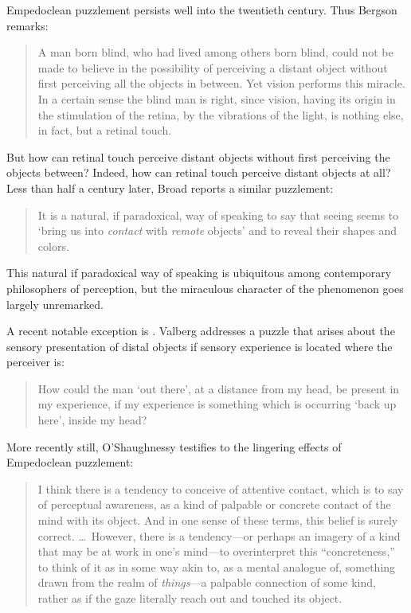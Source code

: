 Empedoclean puzzlement persists well into the twentieth century. Thus Bergson remarks:
\begin{quote}
	A man born blind, who had lived among others born blind, could not be made to believe in the possibility of perceiving a distant object without first perceiving all the objects in between. Yet vision performs this miracle. In a certain sense the blind man is right, since vision, having its origin in the stimulation of the retina, by the vibrations of the light, is nothing else, in fact, but a retinal touch. \citep[168]{Bergson:1907sh}
\end{quote}
But how can retinal touch perceive distant objects without first perceiving the objects between? Indeed, how can retinal touch perceive distant objects at all? Less than half a century later, Broad reports a similar puzzlement:
\begin{quote}
    It is a natural, if paradoxical, way of speaking to say that seeing seems to `bring us into \emph{contact} with \emph{remote} objects' and to reveal their shapes and colors. \citep[33]{Broad:1952kx}
\end{quote}
This natural if paradoxical way of speaking is ubiquitous among contemporary philosophers of perception, but the miraculous character of the phenomenon goes largely unremarked. 

A recent notable exception is \citet{Valberg:1992aa}. Valberg addresses a puzzle that arises about the sensory presentation of distal objects if sensory experience is located where the perceiver is:
\begin{quote}
	How could the man `out there', at a distance from my head, be present in my experience, if my experience is something which is occurring `back up here', inside my head? \citep[141]{Valberg:1992aa}
\end{quote}
More recently still, O'Shaughnessy testifies to the lingering effects of Empedoclean puzzlement:
\begin{quote}
	I think there is a tendency to conceive of attentive contact, which is to say of perceptual awareness, as a kind of palpable or concrete contact of the mind with its object. And in one sense of these terms, this belief is surely correct. \ldots\ However, there is a tendency---or perhaps an imagery of a kind that may be at work in one's mind---to overinterpret this ``concreteness,'' to think of it as in some way akin to, as a mental analogue of, something drawn from the realm of \emph{things}---a palpable connection of some kind, rather as if the gaze literally reach out and touched its object. \citep[183]{OShaughnessy:2003eu}
\end{quote}

